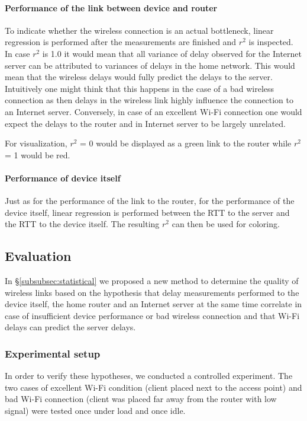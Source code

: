 \documentclass{sig-alternate-10pt}
\begin{document}
\paragraph{Performance of the link between device and router}

To indicate whether the wireless connection is an actual bottleneck, linear regression is performed after the measurements are finished and $r^2$ is inspected. In case $r^2$ is 1.0 it would mean that all variance of delay observed for the Internet server can be attributed to variances of delays in the home network. This would mean that the wireless delays would fully predict the delays to the server. Intuitively one might think that this happens in the case of a bad wireless connection as then delays in the wireless link highly influence the connection to an Internet server. Conversely, in case of an excellent Wi-Fi connection one would expect the delays to the router and in Internet server to be largely unrelated. 

For visualization, $r^2$ = 0 would be displayed as a green link to the router while $r^2$ = 1 would be red. 

\paragraph{Performance of device itself}

Just as for the performance of the link to the router, for the performance of the device itself, linear regression is performed between the RTT to the server and the RTT to the device itself. The resulting $r^2$ can then be used for coloring. 

\subsection{Evaluation}

In \S\ref{subsubsec:statistical} we proposed a new method to determine the quality of wireless links based on the hypothesis that delay measurements performed to the device itself, the home router and an Internet server at the same time correlate in case of insufficient device performance or bad wireless connection and that Wi-Fi delays can predict the server delays. 

\subsubsection{Experimental setup}

In order to verify these hypotheses, we conducted a controlled experiment. The two cases of excellent Wi-Fi condition (client placed next to the access point) and bad Wi-Fi connection (client was placed far away from the router with low signal) were tested once under load and once idle.
\end{document}
